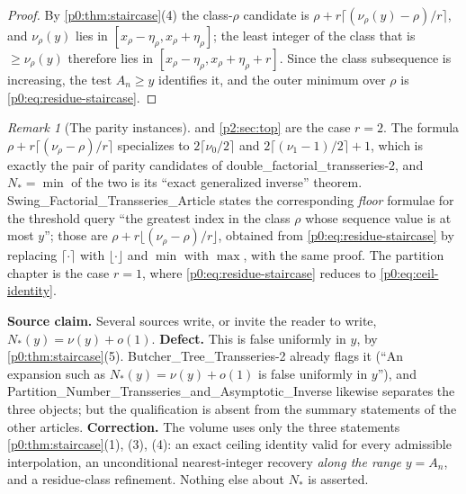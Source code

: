 \documentclass[11pt,a4paper,oneside]{book}
\theoremstyle{plain}
\theoremstyle{definition}
\theoremstyle{remark}
\newtheorem{remark}[theorem]{Remark}
\newcommand{\littleo}{o}
\begin{document}
\begin{proof}
By \cref{p0:thm:staircase}(4) the class-$\rho$ candidate is
$\rho+r\lceil(\nu_\rho(y)-\rho)/r\rceil$, and $\nu_\rho(y)$ lies in
$[x_\rho-\eta_\rho,x_\rho+\eta_\rho]$; the least integer of the class that is
$\ge\nu_\rho(y)$ therefore lies in $[x_\rho-\eta_\rho,x_\rho+\eta_\rho+r]$.
Since the class subsequence is increasing, the test $A_n\ge y$ identifies it,
and the outer minimum over $\rho$ is \eqref{p0:eq:residue-staircase}.
\end{proof}

\begin{remark}[The parity instances]\label{p0:rem:parity-instances}
 and \cref{p2:sec:top} are the case $r=2$.  The formula
$\rho+r\lceil(\nu_\rho-\rho)/r\rceil$ specializes to
$2\lceil\nu_0/2\rceil$ and $2\lceil(\nu_1-1)/2\rceil+1$, which is exactly the
pair of parity candidates of \textsf{double\_factorial\_transseries-2}, and
$N_\ast=\min$ of the two is its ``exact generalized inverse'' theorem.
\textsf{Swing\_Factorial\_Transseries\_Article} states the corresponding
\emph{floor} formulae for the threshold query ``the greatest index in the class
$\rho$ whose sequence value is at most $y$''; those are
$\rho+r\lfloor(\nu_\rho-\rho)/r\rfloor$, obtained from
\eqref{p0:eq:residue-staircase} by replacing $\lceil\cdot\rceil$ with
$\lfloor\cdot\rfloor$ and $\min$ with $\max$, with the same proof.  The
partition chapter is the case $r=1$, where
\eqref{p0:eq:residue-staircase} reduces to \eqref{p0:eq:ceil-identity}.
\end{remark}

\begin{repairbox}
\textbf{Source claim.}  Several sources write, or invite the reader to write,
$N_\ast(y)=\nu(y)+\littleo(1)$.
\textbf{Defect.}  This is false uniformly in $y$, by
\cref{p0:thm:staircase}(5).  \textsf{Butcher\_Tree\_Transseries-2} already
flags it (``An expansion such as $N_\ast(y)=\nu(y)+\littleo(1)$ is
false uniformly in $y$''), and
\textsf{Partition\_Number\_Transseries\_and\_Asymptotic\_Inverse} likewise
separates the three objects; but the qualification is absent from the summary
statements of the other articles.
\textbf{Correction.}  The volume uses only the three statements
\cref{p0:thm:staircase}(1), (3), (4): an exact ceiling identity valid for every
admissible interpolation, an unconditional nearest-integer recovery
\emph{along the range} $y=A_n$, and a residue-class refinement.  Nothing else
about $N_\ast$ is asserted.
\end{repairbox}
\end{document}
